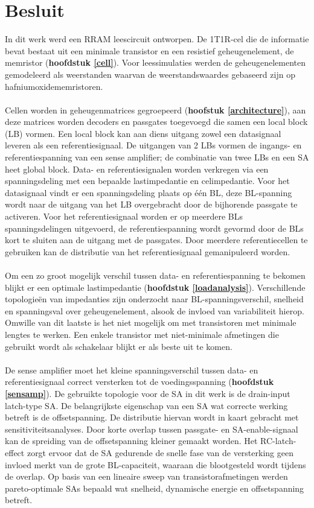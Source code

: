 \chapter{Besluit}
\label{besluit}
In dit werk werd een RRAM leescircuit ontworpen. De 1T1R-cel die de informatie bevat bestaat uit een minimale transistor en een resistief geheugenelement, de memristor (\textbf{hoofdstuk \ref{cell}}). Voor leessimulaties werden de geheugenelementen gemodeleerd als weerstanden waarvan de weerstandswaardes gebaseerd zijn op hafniumoxidememristoren.\\\\
Cellen worden in geheugenmatrices gegroepeerd (\textbf{hoofstuk \ref{architecture}}), aan deze matrices worden decoders en passgates toegevoegd die samen een local block (LB) vormen. Een local block kan aan diens uitgang zowel een datasignaal leveren als een referentiesignaal. De uitgangen van 2 LBs vormen de ingangs- en referentiespanning van een sense amplifier; de combinatie van twee LBs en een SA heet global block. Data- en referentiesignalen worden verkregen via een spanningsdeling met een bepaalde lastimpedantie en celimpedantie. Voor het datasignaal vindt er een spanningsdeling plaats op één BL, deze BL-spanning wordt naar de uitgang van het LB overgebracht door de bijhorende passgate te activeren. Voor het referentiesignaal worden er op meerdere BLs spanningsdelingen uitgevoerd, de referentiespanning wordt gevormd door de BLs kort te sluiten aan de uitgang met de passgates. Door meerdere referentiecellen te gebruiken kan de distributie van het referentiesignaal gemanipuleerd worden.\\\\
Om een zo groot mogelijk verschil tussen data- en referentiespanning te bekomen blijkt er een optimale lastimpedantie (\textbf{hoofdstuk \ref{loadanalysis}}). Verschillende topologieën van impedanties zijn onderzocht naar BL-spanningsverschil, snelheid en spanningsval over geheugenelement, alsook de invloed van variabiliteit hierop. Omwille van dit laatste is het niet mogelijk om met transistoren met minimale lengtes te werken. Een enkele transistor met niet-minimale afmetingen die gebruikt wordt als schakelaar blijkt er als beste uit te komen.\\\\
De sense amplifier moet het kleine spanningsverschil tussen data- en referentiesignaal correct versterken tot de voedingsspanning (\textbf{hoofdstuk \ref{sensamp}}). De gebruikte topologie voor de SA in dit werk is de drain-input latch-type SA. De belangrijkste eigenschap van een SA wat correcte werking betreft is de offsetspanning. De distributie hiervan wordt in kaart gebracht met sensitiviteitsanalyses. Door korte overlap tussen passgate- en SA-enable-signaal kan de spreiding van de offsetspanning kleiner gemaakt worden. Het RC-latch-effect zorgt ervoor dat de SA gedurende de snelle fase van de versterking geen invloed merkt van de grote BL-capaciteit, waaraan die blootgesteld wordt tijdens de overlap. Op basis van een lineaire sweep van transistorafmetingen werden pareto-optimale SAs bepaald wat snelheid, dynamische energie en offsetspanning betreft.\\\\
